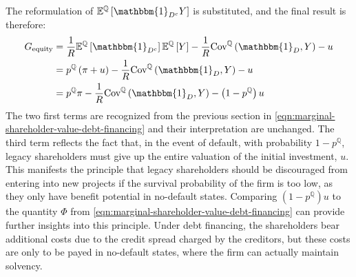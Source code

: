 \documentclass[../main.tex]{subfiles}
\begin{document}
        The reformulation of $\mathbb{E}^{\mathbb{Q}}\left[\mathbbm{1}_{D^{c}} Y\right]$ is substituted, 
        and the final result is therefore:
            \begin{align}
                G_{\text{equity}} &=
                    \discountfactor
                    \mathbb{E}^{\mathbb{Q}}\left[\mathbbm{1}_{D^{c}}\right]
                    \mathbb{E}^{\mathbb{Q}}\left[Y\right]
                    -
                    \discountfactor
                    \text{Cov}^{\mathbb{Q}}\left(
                        \mathbbm{1}_{D},
                        Y
                    \right)
                    -
                    u
                    \nonumber \\
                &= 
                    p^{\mathbb{Q}}
                    \left(
                        \pi
                        +
                        u
                    \right)
                    -
                    \discountfactor
                    \text{Cov}^{\mathbb{Q}}\left(
                        \mathbbm{1}_{D},
                        Y
                    \right)
                    -
                    u 
                    \nonumber \\
                &= 
                    p^{\mathbb{Q}}
                    \pi
                    -
                    \discountfactor
                    \text{Cov}^{\mathbb{Q}}\left(
                        \mathbbm{1}_{D},
                        Y
                    \right)
                    -
                    \left(
                        1
                        -
                        p^{\mathbb{Q}}
                    \right)
                    u 
                \label{eqn:marginal-shareholder-value-equity-financing}
            \end{align}
        The two first terms are recognized from the previous section in 
        \cref{eqn:marginal-shareholder-value-debt-financing}
        and their interpretation are unchanged. 
        The third term reflects the fact that, in the event of default, with probability $1-p^{\mathbb{Q}}$, 
        legacy shareholders must give up the entire valuation of the initial investment, $u$.
        This manifests the principle that legacy shareholders should be discouraged 
        from entering into new projects if the survival probability of the firm is too low,
        as they only have benefit potential in no-default states.
        Comparing $(1-p^{\mathbb{Q}})u$ to the quantity $\Phi$ from
        \cref{eqn:marginal-shareholder-value-debt-financing} can provide further insights into this principle.
        Under debt financing, the shareholders bear additional costs 
        due to the credit spread charged by the creditors, 
        but these costs are only to be payed in no-default states,
        where the firm can actually maintain solvency.
\end{document}
